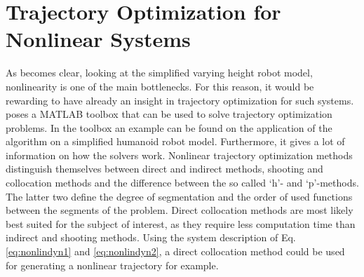 \section{Trajectory Optimization for Nonlinear Systems}
As becomes clear, looking at the simplified varying height robot model, nonlinearity is one of the main bottlenecks. For this reason, it would be rewarding to have already an insight in trajectory optimization for such systems. \cite{kelly2017introduction} poses a MATLAB  toolbox that can be used to solve trajectory optimization problems. In the toolbox an example can be found on the application of the algorithm on a simplified humanoid robot model. Furthermore, it gives a lot of information on how the solvers work. Nonlinear trajectory optimization methods distinguish themselves between direct and indirect methods, shooting and collocation methods and the difference between the so called `h'- and `p'-methods. The latter two define the degree of segmentation and the order of used functions between the segments of the problem. Direct collocation methods are most likely best suited for the subject of interest, as they require less computation time than indirect and shooting methods. Using the system description of Eq. \eqref{eq:nonlindyn1} and \eqref{eq:nonlindyn2}, a direct collocation method could be used for generating a nonlinear trajectory for example. 

